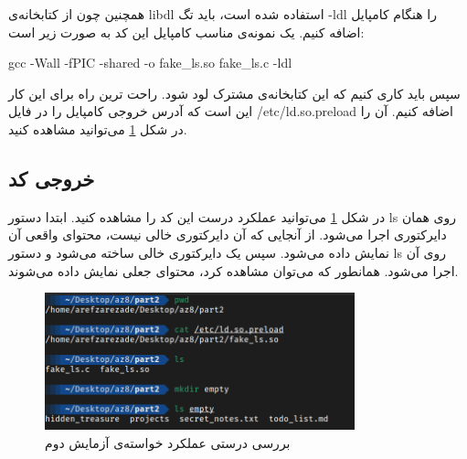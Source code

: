 \documentclass[12pt]{article}
\begin{document}
        همچنین چون از کتابخانه‌ی 
        \textenglish{libdl}
        استفاده شده است، باید تگ
        \textenglish{-ldl}
        را هنگام کامپایل اضافه کنیم. یک نمونه‌ی مناسب کامپایل این کد به صورت زیر است:

        \begin{english}
            gcc -Wall -fPIC -shared -o fake\_ls.so fake\_ls.c -ldl
        \end{english}
        
        سپس باید کاری کنیم که این کتابخانه‌ی مشترک لود شود. راحت ترین راه برای این کار این است که آدرس خروجی کامپایل را در فایل 
        \textenglish{/etc/ld.so.preload}
        اضافه کنیم. آن را در شکل
        \ref{im7}
        می‌توانید مشاهده کنید.

        \subsection{خروجی کد}
        در شکل 
        \ref{im7}
        می‌توانید عملکرد درست این کد را مشاهده کنید. ابتدا دستور 
        \textenglish{ls}
        روی همان دایرکتوری اجرا می‌شود. از آنجایی که آن دایرکتوری خالی نیست، محتوای واقعی آن نمایش داده می‌شود. سپس یک دایرکتوری خالی ساخته می‌شود و دستور 
        \textenglish{ls}
        روی آن اجرا می‌شود. همانطور که می‌توان مشاهده کرد، محتوای جعلی نمایش داده می‌شوند.

        \begin{figure}[H]
		\centering
		\includegraphics[width=0.8\textwidth]{report8-resources/7.png}
		\caption{بررسی درستی عملکرد خواسته‌ی آزمایش دوم}
            \label{im7}
	\end{figure}
	
	\newpage
	\begin{LTR}
		\begin{english}
\printbibliography[title={مراجع}]
\end{english}
	\end{LTR}

	
\end{document}
